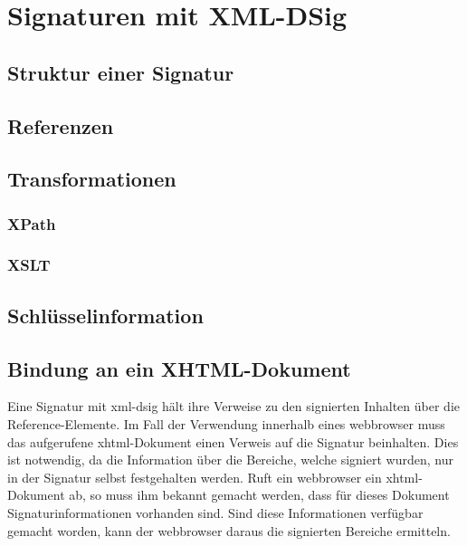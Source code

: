 
\chapter{Signaturen mit XML-DSig}
\label{chp:SignaturenXMLDSig}

\section{Struktur einer Signatur}

\section{Referenzen}
\label{sec:Signaturbindung:Referenzen}

\section{Transformationen}
\label{sec:Signaturbindung:Transformationen}

\subsection{XPath}
\label{sec:Signaturbindung:Transformationen:XPath}

\subsection{XSLT}
\label{sec:Signaturbindung:Transformationen:XSLT}

\section{Schlüsselinformation}

\section{Bindung an ein XHTML-Dokument}
Eine Signatur mit \gls{xml-dsig} hält ihre Verweise zu den signierten Inhalten über die Reference-Elemente. Im Fall der Verwendung innerhalb eines
\gls{webbrowser} muss das aufgerufene \gls{xhtml}-Dokument einen Verweis auf die Signatur beinhalten. Dies ist notwendig, da die Information über die Bereiche,
welche signiert wurden, nur in der Signatur selbst festgehalten werden. Ruft ein \gls{webbrowser} ein \gls{xhtml}-Dokument ab, so muss ihm bekannt gemacht
werden, dass für dieses Dokument Signaturinformationen vorhanden sind. Sind diese Informationen verfügbar gemacht worden, kann der \gls{webbrowser} daraus die
signierten Bereiche ermitteln.\\

